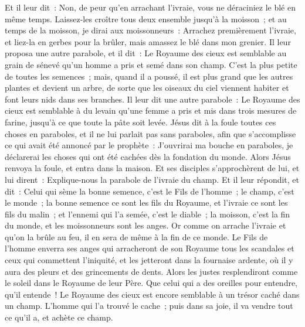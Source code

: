 \begin{multicols}{2}
Et il leur dit~: Non, de peur qu'en arrachant l'ivraie, vous ne déraciniez le blé en même temps.
Laissez-les croître tous deux ensemble jusqu'à la moisson~; et au temps de la moisson, je dirai aux moissonneurs~: Arrachez premièrement l'ivraie, et liez-la en gerbes pour la brûler, mais amassez le blé dans mon grenier.
Il leur proposa une autre parabole, et il dit~: Le Royaume des cieux est semblable au grain de sénevé qu'un homme a pris et semé dans son champ.
C'est la plus petite de toutes les semences~; mais, quand il a poussé, il est plus grand que les autres plantes et devient un arbre, de sorte que les oiseaux du ciel viennent habiter et font leurs nids dans ses branches.
Il leur dit une autre parabole~: Le Royaume des cieux est semblable à du levain qu'une femme a pris et mis dans trois mesures de farine, jusqu'à ce que toute la pâte soit levée.
Jésus dit à la foule toutes ces choses en paraboles, et il ne lui parlait pas sans paraboles,
afin que s'accomplisse ce qui avait été annoncé par le prophète~: J'ouvrirai ma bouche en paraboles, je déclarerai les choses qui ont été cachées dès la fondation du monde.
Alors Jésus renvoya la foule, et entra dans la maison. Et ses disciples s'approchèrent de lui, et lui dirent~: Explique-nous la parabole de l'ivraie du champ.
Et il leur répondit, et dit~: Celui qui sème la bonne semence, c'est le Fils de l'homme~;
le champ, c'est le monde~; la bonne semence ce sont les fils du Royaume, et l'ivraie ce sont les fils du malin~;
et l'ennemi qui l'a semée, c'est le diable~; la moisson, c'est la fin du monde, et les moissonneurs sont les anges.
Or comme on arrache l'ivraie et qu'on la brûle au feu, il en sera de même à la fin de ce monde.
Le Fils de l'homme enverra ses anges qui arracheront de son Royaume tous les scandales et ceux qui commettent l'iniquité,
et les jetteront dans la fournaise ardente, où il y aura des pleurs et des grincements de dents.
Alors les justes resplendiront comme le soleil dans le Royaume de leur Père. Que celui qui a des oreilles pour entendre, qu'il entende~!
Le Royaume des cieux est encore semblable à un trésor caché dans un champ. L'homme qui l'a trouvé le cache~; puis dans sa joie, il va vendre tout ce qu'il a, et achète ce champ.

\end{multicols}
